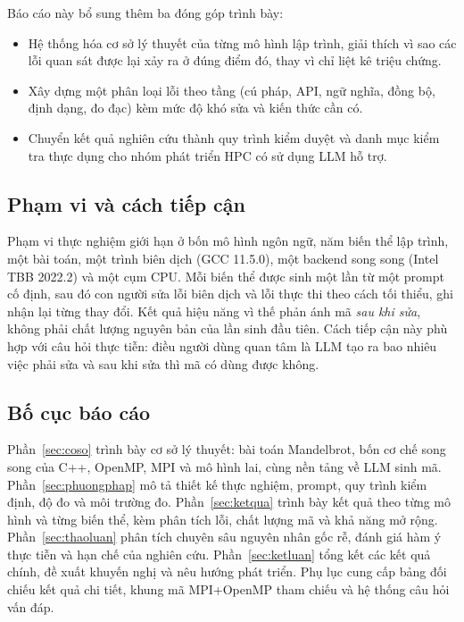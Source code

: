 Báo cáo này bổ sung thêm ba đóng góp trình bày:

\begin{itemize}
  \item Hệ thống hóa cơ sở lý thuyết của từng mô hình lập trình, giải thích vì sao
        các lỗi quan sát được lại xảy ra ở đúng điểm đó, thay vì chỉ liệt kê triệu
        chứng.
  \item Xây dựng một phân loại lỗi theo tầng (cú pháp, API, ngữ nghĩa, đồng bộ,
        định dạng, đo đạc) kèm mức độ khó sửa và kiến thức cần có.
  \item Chuyển kết quả nghiên cứu thành quy trình kiểm duyệt và danh mục kiểm tra
        thực dụng cho nhóm phát triển HPC có sử dụng LLM hỗ trợ.
\end{itemize}

\subsection{Phạm vi và cách tiếp cận}

Phạm vi thực nghiệm giới hạn ở bốn mô hình ngôn ngữ, năm biến thể lập trình, một
bài toán, một trình biên dịch (GCC 11.5.0), một backend song song (Intel TBB
2022.2) và một cụm CPU. Mỗi biến thể được sinh một lần từ một prompt cố định,
sau đó con người sửa lỗi biên dịch và lỗi thực thi theo cách tối thiểu, ghi nhận
lại từng thay đổi. Kết quả hiệu năng vì thế phản ánh mã \emph{sau khi sửa}, không
phải chất lượng nguyên bản của lần sinh đầu tiên. Cách tiếp cận này phù hợp với
câu hỏi thực tiễn: điều người dùng quan tâm là LLM tạo ra bao nhiêu việc phải sửa
và sau khi sửa thì mã có dùng được không.

\subsection{Bố cục báo cáo}

Phần~\ref{sec:coso} trình bày cơ sở lý thuyết: bài toán Mandelbrot, bốn cơ chế
song song của C++, OpenMP, MPI và mô hình lai, cùng nền tảng về LLM sinh mã.
Phần~\ref{sec:phuongphap} mô tả thiết kế thực nghiệm, prompt, quy trình kiểm định,
độ đo và môi trường đo. Phần~\ref{sec:ketqua} trình bày kết quả theo từng mô hình
và từng biến thể, kèm phân tích lỗi, chất lượng mã và khả năng mở rộng.
Phần~\ref{sec:thaoluan} phân tích chuyên sâu nguyên nhân gốc rễ, đánh giá hàm ý
thực tiễn và hạn chế của nghiên cứu. Phần~\ref{sec:ketluan} tổng kết các kết quả
chính, đề xuất khuyến nghị và nêu hướng phát triển. Phụ lục cung cấp bảng đối
chiếu kết quả chi tiết, khung mã MPI+OpenMP tham chiếu và hệ thống câu hỏi vấn
đáp.
